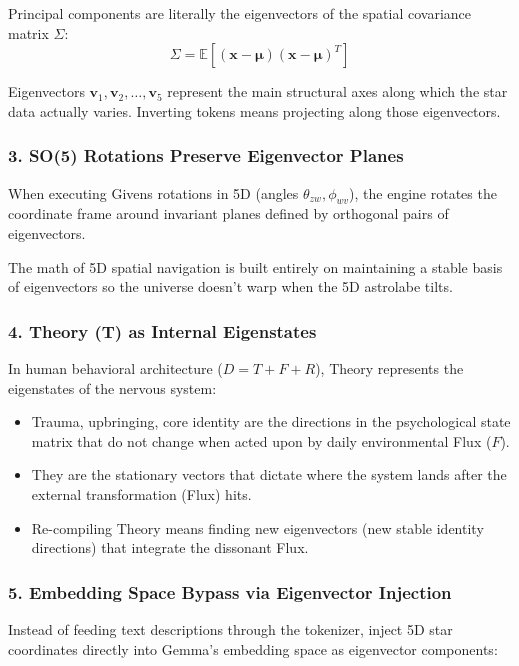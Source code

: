\documentclass[11pt,oneside]{article}
\theoremstyle{definition}
\begin{document}
Principal components are literally the eigenvectors of the spatial covariance matrix $\Sigma$:
\[
\Sigma = \mathbb{E}[(\mathbf{x} - \boldsymbol{\mu})(\mathbf{x} - \boldsymbol{\mu})^T]
\]

Eigenvectors $\mathbf{v}_1, \mathbf{v}_2, \ldots, \mathbf{v}_5$ represent the main structural axes along which the star data actually varies. Inverting tokens means projecting along those eigenvectors.

\subsubsection{3. SO(5) Rotations Preserve Eigenvector Planes}

When executing Givens rotations in 5D (angles $\theta_{zw}, \phi_{wv}$), the engine rotates the coordinate frame around invariant planes defined by orthogonal pairs of eigenvectors.

The math of 5D spatial navigation is built entirely on maintaining a stable basis of eigenvectors so the universe doesn't warp when the 5D astrolabe tilts.

\subsubsection{4. Theory (T) as Internal Eigenstates}

In human behavioral architecture ($D = T + F + R$), Theory represents the eigenstates of the nervous system:

\begin{itemize}
  \item Trauma, upbringing, core identity are the directions in the psychological state matrix that do not change when acted upon by daily environmental Flux ($F$).
  \item They are the stationary vectors that dictate where the system lands after the external transformation (Flux) hits.
  \item Re-compiling Theory means finding new eigenvectors (new stable identity directions) that integrate the dissonant Flux.
\end{itemize}

\subsubsection{5. Embedding Space Bypass via Eigenvector Injection}

Instead of feeding text descriptions through the tokenizer, inject 5D star coordinates directly into Gemma's embedding space as eigenvector components:
\end{document}
